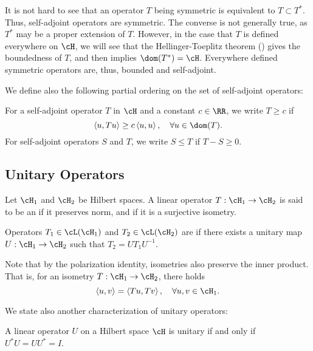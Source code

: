 \documentclass[oneside,reqno,letterpaper]{amsart}
\begin{document}
It is not hard to see that an operator \(T\) being symmetric is equivalent to \(T \subset T^*\).
Thus, self-adjoint operators are symmetric. 
The converse is not generally true, as \(T^*\) may be a proper extension of \(T\). 
However, in the case that \(T\) is defined everywhere on \(\cH\), we will see that the Hellinger-Toeplitz theorem () gives the boundedness of \(T\), and  then implies \(\dom(T^*) = \cH\). 
Everywhere defined symmetric operators are, thus, bounded and self-adjoint. 

We define also the following partial ordering on the set of self-adjoint operators: 
\begin{definition}
\label{def:self-adjoint-partial-ordering}
  For a self-adjoint operator \(T\) in \(\cH\) and a constant \(c \in \RR\), we write \(T \geq c\) if 
  \[
  \left< u, Tu \right> \geq c \left< u, u \right>, \quad \forall u \in \dom(T). 
  \] 
  For self-adjoint operators \(S\) and \(T\), we write \(S \leq T\) if \(T - S \geq 0\).
\end{definition}





\subsection{Unitary Operators}

\begin{definition}
  Let \(\cH_1\) and \(\cH_2\) be Hilbert spaces. A linear operator \(T: \cH_1 \to \cH_2\) is said to be 
  an  if it preserves norm, and 
   if it is a surjective isometry. 

  Operators \(T_1 \in \cL(\cH_1)\) and \(T_2 \in \cL(\cH_2)\) are  if there exists a unitary map \(U: \cH_1 \to \cH_2\) such that \(T_2 = U T_1 U^{-1}\). 
\end{definition}

Note that by the polarization identity, isometries also preserve the inner product. That is, for an isometry \(T: \cH_1 \to \cH_2\), there holds 
\[
\left< u, v \right> = \left< Tu, Tv \right>, \quad \forall u, v \in \cH_1 . 
\]

We state also another characterization of unitary operators: 

\begin{proposition}
\label{thm:unitary-characterization}
  A linear operator \(U\) on a Hilbert space \(\cH\) is unitary if and only if \(U^* U = U U^* = I\). 
\end{proposition}
\end{document}
